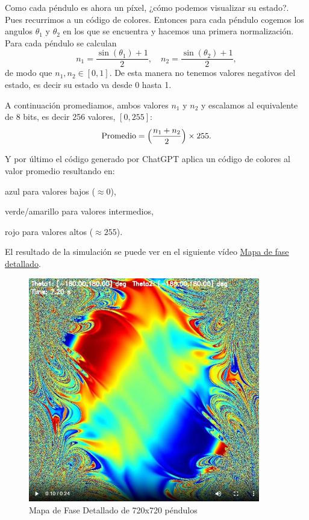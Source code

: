 \documentclass[
  10pt,
  a4paper,
  DIV=11,
  numbers=noendperiod,
  open=any]{scrreprt}
\numberwithin{equation}{chapter}
\numberwithin{equation}{section}
\renewcommand{\[}{\begin{equation}}
\renewcommand{\]}{\end{equation}}
\begin{document}
Como cada péndulo es ahora un píxel, ¿cómo podemos visualizar su
estado?. Pues recurrimos a un código de colores. Entonces para cada
péndulo cogemos los angulos \(\theta_1\) y \(\theta_2\) en los que se
encuentra y hacemos una primera normalización. Para cada péndulo se
calculan \[
     n_1 = \frac{\sin(\theta_1) + 1}{2},
     \quad
     n_2 = \frac{\sin(\theta_2) + 1}{2},
   \] de modo que \(n_1,n_2 \in [0,1]\). De esta manera no tenemos
valores negativos del estado, es decir su estado va desde 0 hasta 1.

A continuación promediamos, ambos valores \(n_1\) y \(n_2\) y escalamos
al equivalente de 8 bits, es decir 256 valores, \([0,255]\): \[
     \text{Promedio} = \Bigl(\frac{n_1 + n_2}{2}\Bigr)\times 255.
   \]

Y por último el código generado por ChatGPT aplica un código de colores
al valor promedio resultando en:

azul para valores bajos (\(\approx 0\)),

verde/amarillo para valores intermedios,

rojo para valores altos (\(\approx 255\)).

El resultado de la simulación se puede ver en el siguiente vídeo \href{https://colacaos.github.io/ColaCAOS/02-pendulo-doble/MapaFase.mp4}{Mapa de fase detallado}.

\begin{figure}[h]
  \centering
  \includegraphics[width=0.9\textwidth]{02-pendulo-doble/mapafases2.png}
  \caption{Mapa de Fase Detallado de 720x720 péndulos}
\end{figure}
\end{document}
